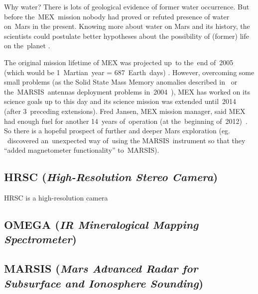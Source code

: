Why water? There is lots of geological evidence of former water occurrence. But before the~MEX~mission nobody had proved or refuted presence of water on~Mars in the present. Knowing more about water on Mars and its history, the scientists could postulate better hypotheses about the possibility of (former) life on the~planet \citep[p.~ix]{Chicarro2004}. 

The original mission lifetime of MEX was projected up~to the~end of~2005 (which would be 1~Martian~year = 687~Earth~days) \citep{ESA2004}. However, overcoming some small problems (as the Solid State Mass Memory anomalies described in~\citep{ESA2011} or the~MARSIS~antennas deployment problems in~2004~\citep{ESA2004a,ESA2005}), MEX has worked on its science goals up to this day and its science mission was extended until~2014~\citep{ESA2013} (after 3~preceding extensions). Fred Jansen, MEX mission manager, said MEX had enough fuel for another 14~years of~operation (at the~beginning of~2012)~\citep{Clark2012}. So there is a hopeful prospect of further and deeper Mars exploration (eg. \citep{Gurnett2005}~discovered an~unexpected way of~using the MARSIS~instrument so that they ``added magnetometer functionality'' to~MARSIS).

\subsection{HRSC (\textit{High-Resolution Stereo Camera})}
HRSC is a high-resolution camera

\subsection{OMEGA (\textit{IR Mineralogical Mapping Spectrometer})}

\subsection{MARSIS (\textit{Mars Advanced Radar for Subsurface and Ionosphere
Sounding})}
